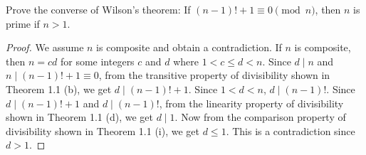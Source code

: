 \begin{exercise}{5.7}
  Prove the converse of Wilson's theorem: If \( (n - 1)! + 1 \equiv 0
  \pmod{n} \), then \( n \) is prime if \( n > 1 \).
\end{exercise}

\begin{proof}
  We assume \( n \) is composite and obtain a contradiction. If \( n
  \) is composite, then \( n = cd \) for some integers \( c \) and \(
  d \) where \( 1 < c \le d < n \). Since \( d \mid n \) and \( n \mid
  (n - 1)! + 1 \equiv 0 \), from the transitive property of
  divisibility shown in Theorem 1.1 (b), we get \( d \mid (n - 1)! + 1
  \). Since \( 1 < d < n \), \( d \mid (n - 1)! \). Since \( d \mid (n
  - 1)! + 1 \) and \( d \mid (n - 1)! \), from the linearity property
  of divisibility shown in Theorem 1.1 (d), we get \( d \mid 1 \). Now
  from the comparison property of divisibility shown in Theorem 1.1
  (i), we get \( d \le 1 \). This is a contradiction since \( d > 1
  \).
\end{proof}
